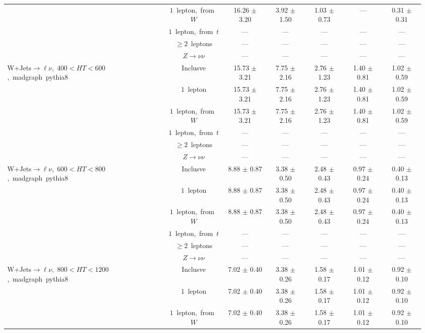 \documentclass{article}
\begin{document}
\begin{longtable}{|l|c|c|c|c|c|c|}
 & $1$~lepton,~from~$W$  & 16.26 $\pm$ 3.20  & 3.92 $\pm$ 1.50  & 1.03 $\pm$ 0.73  & ---  & 0.31 $\pm$ 0.31 \\* 
 & $1$~lepton,~from~$t$  & ---  & ---  & ---  & ---  & --- \\* 
 & $\ge2$~leptons  & ---  & ---  & ---  & ---  & --- \\* 
 & $Z\rightarrow\nu\nu$  & ---  & ---  & ---  & ---  & --- \\* 
\hline 
\multirow{6}{*}{W+Jets$\rightarrow\ell\nu$,~$400<HT<600$,~madgraph~pythia8} & Inclusve  & 15.73 $\pm$ 3.21  & 7.75 $\pm$ 2.16  & 2.76 $\pm$ 1.23  & 1.40 $\pm$ 0.81  & 1.02 $\pm$ 0.59 \\* 
 & $1$~lepton  & 15.73 $\pm$ 3.21  & 7.75 $\pm$ 2.16  & 2.76 $\pm$ 1.23  & 1.40 $\pm$ 0.81  & 1.02 $\pm$ 0.59 \\* 
 & $1$~lepton,~from~$W$  & 15.73 $\pm$ 3.21  & 7.75 $\pm$ 2.16  & 2.76 $\pm$ 1.23  & 1.40 $\pm$ 0.81  & 1.02 $\pm$ 0.59 \\* 
 & $1$~lepton,~from~$t$  & ---  & ---  & ---  & ---  & --- \\* 
 & $\ge2$~leptons  & ---  & ---  & ---  & ---  & --- \\* 
 & $Z\rightarrow\nu\nu$  & ---  & ---  & ---  & ---  & --- \\* 
\hline 
\multirow{6}{*}{W+Jets$\rightarrow\ell\nu$,~$600<HT<800$,~madgraph~pythia8} & Inclusve  & 8.88 $\pm$ 0.87  & 3.38 $\pm$ 0.50  & 2.48 $\pm$ 0.43  & 0.97 $\pm$ 0.24  & 0.40 $\pm$ 0.13 \\* 
 & $1$~lepton  & 8.88 $\pm$ 0.87  & 3.38 $\pm$ 0.50  & 2.48 $\pm$ 0.43  & 0.97 $\pm$ 0.24  & 0.40 $\pm$ 0.13 \\* 
 & $1$~lepton,~from~$W$  & 8.88 $\pm$ 0.87  & 3.38 $\pm$ 0.50  & 2.48 $\pm$ 0.43  & 0.97 $\pm$ 0.24  & 0.40 $\pm$ 0.13 \\* 
 & $1$~lepton,~from~$t$  & ---  & ---  & ---  & ---  & --- \\* 
 & $\ge2$~leptons  & ---  & ---  & ---  & ---  & --- \\* 
 & $Z\rightarrow\nu\nu$  & ---  & ---  & ---  & ---  & --- \\* 
\hline 
\multirow{6}{*}{W+Jets$\rightarrow\ell\nu$,~$800<HT<1200$,~madgraph~pythia8} & Inclusve  & 7.02 $\pm$ 0.40  & 3.38 $\pm$ 0.26  & 1.58 $\pm$ 0.17  & 1.01 $\pm$ 0.12  & 0.92 $\pm$ 0.10 \\* 
 & $1$~lepton  & 7.02 $\pm$ 0.40  & 3.38 $\pm$ 0.26  & 1.58 $\pm$ 0.17  & 1.01 $\pm$ 0.12  & 0.92 $\pm$ 0.10 \\* 
 & $1$~lepton,~from~$W$  & 7.02 $\pm$ 0.40  & 3.38 $\pm$ 0.26  & 1.58 $\pm$ 0.17  & 1.01 $\pm$ 0.12  & 0.92 $\pm$ 0.10 \\* 

\end{longtable}
\end{document}
